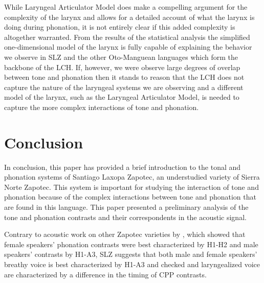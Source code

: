 \documentclass[12pt, letterpaper]{article}
\begin{document}
While  Laryngeal Articulator Model does make a compelling argument for the complexity of the larynx and allows for a detailed account of what the larynx is doing during phonation, it is not entirely clear if this added complexity is altogether warranted. From the results of the statistical analysis the simplified one-dimensional model of the larynx is fully capable of explaining the behavior we observe in SLZ and the other Oto-Manguean languages which form the backbone of the LCH. If, however, we were observe large degrees of overlap between tone and phonation then it stands to reason that the LCH does not capture the nature of the laryngeal systems we are observing and a different model of the larynx, such as the Laryngeal Articulator Model, is needed to capture the more complex interactions of tone and phonation. 

\section{Conclusion} \label{sec:Conclusion}

In conclusion, this paper has provided a brief introduction to the tonal and phonation systems of Santiago Laxopa Zapotec, an understudied variety of Sierra Norte Zapotec. This system is important for studying the interaction of tone and phonation because of the complex interactions between tone and phonation that are found in this language. This paper presented a preliminary analysis of the tone and phonation contrasts and their correspondents in the acoustic signal. 

Contrary to acoustic work on other Zapotec varieties by \citet{espositoVariationContrastivePhonation2010}, which showed that female speakers' phonation contrasts were best characterized by H1-H2 and male speakers' contrasts by H1-A3, SLZ suggests that both male and female speakers' breathy voice is best characterized by H1-A3 and checked and laryngealized voice are characterized by a difference in the timing of CPP contrasts. 

\end{document}
